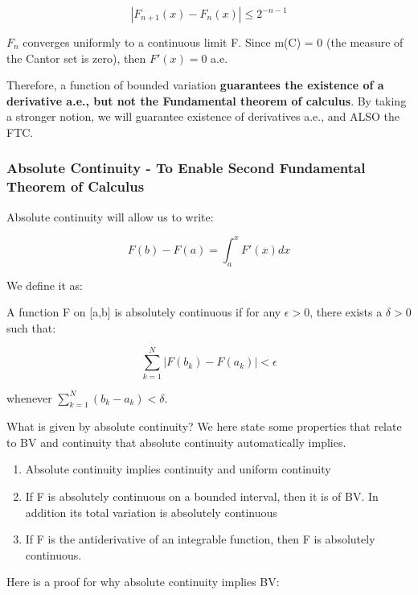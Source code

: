 \documentclass[class=article, crop=false]{standalone}
\begin{document}
				$$|F_{n+1}(x) - F_n(x)| \le 2^{-n-1}$$

			$F_n$ converges uniformly to a continuous limit F. Since m(C) = 0 (the measure of the Cantor set is zero), then $F'(x) = 0$ a.e.

			Therefore, a function of bounded variation \textbf{guarantees the existence of a derivative a.e., but not the Fundamental theorem of calculus}. By taking a stronger notion, we will guarantee existence of derivatives a.e., and ALSO the FTC.

		\subsubsection{Absolute Continuity - To Enable Second Fundamental Theorem of Calculus}
			Absolute continuity will allow us to write:

				$$F(b) - F(a) = \int_a^x F'(x) dx$$

			We define it as:

			\begin{definition} 
				A function F on [a,b] is absolutely continuous if for any $\epsilon > 0$, there exists a $\delta > 0$ such that:

					$$\sum_{k=1}^N |F(b_k) - F(a_k)| < \epsilon$$

				whenever $\sum_{k=1}^N (b_k - a_k) < \delta$.
			\end{definition}

			What is given by absolute continuity? We here state some properties that relate to BV and continuity that absolute continuity automatically implies.

			\begin{enumerate}
				\item Absolute continuity implies continuity and uniform continuity
				\item If F is absolutely continuous on a bounded interval, then it is of BV. In addition its total variation is absolutely continuous
				\item If F is the antiderivative of an integrable function, then F is absolutely continuous.
			\end{enumerate}

			Here is a proof for why absolute continuity implies BV:
\end{document}
